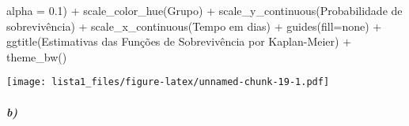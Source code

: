 \documentclass[
]{article}
\newenvironment{Shaded}{\begin{snugshade}}{\end{snugshade}}
\newcommand{\AttributeTok}[1]{\textcolor[rgb]{0.77,0.63,0.00}{#1}}
\newcommand{\FloatTok}[1]{\textcolor[rgb]{0.00,0.00,0.81}{#1}}
\newcommand{\FunctionTok}[1]{\textcolor[rgb]{0.00,0.00,0.00}{#1}}
\newcommand{\NormalTok}[1]{#1}
\newcommand{\SpecialCharTok}[1]{\textcolor[rgb]{0.00,0.00,0.00}{#1}}
\newcommand{\StringTok}[1]{\textcolor[rgb]{0.31,0.60,0.02}{#1}}
\begin{document}
\begin{Shaded}
\begin{Highlighting}[]
                             \AttributeTok{alpha =} \FloatTok{0.1}\NormalTok{) }\SpecialCharTok{+}
  \FunctionTok{scale\_color\_hue}\NormalTok{(}\StringTok{\textquotesingle{}Grupo\textquotesingle{}}\NormalTok{) }\SpecialCharTok{+}
  \FunctionTok{scale\_y\_continuous}\NormalTok{(}\StringTok{\textquotesingle{}Probabilidade de sobrevivência\textquotesingle{}}\NormalTok{) }\SpecialCharTok{+}
  \FunctionTok{scale\_x\_continuous}\NormalTok{(}\StringTok{\textquotesingle{}Tempo em dias\textquotesingle{}}\NormalTok{) }\SpecialCharTok{+}
  \FunctionTok{guides}\NormalTok{(}\AttributeTok{fill=}\StringTok{\textquotesingle{}none\textquotesingle{}}\NormalTok{) }\SpecialCharTok{+}
  \FunctionTok{ggtitle}\NormalTok{(}\StringTok{\textquotesingle{}Estimativas das Funções de Sobrevivência por Kaplan{-}Meier\textquotesingle{}}\NormalTok{) }\SpecialCharTok{+}
  \FunctionTok{theme\_bw}\NormalTok{()}
\end{Highlighting}
\end{Shaded}

\texttt{[image: lista1\_files/figure-latex/unnamed-chunk-19-1.pdf]}

\hypertarget{b-3}{%
\subparagraph{b)}\label{b-3}}

\hspace{2 pt}
\end{document}
